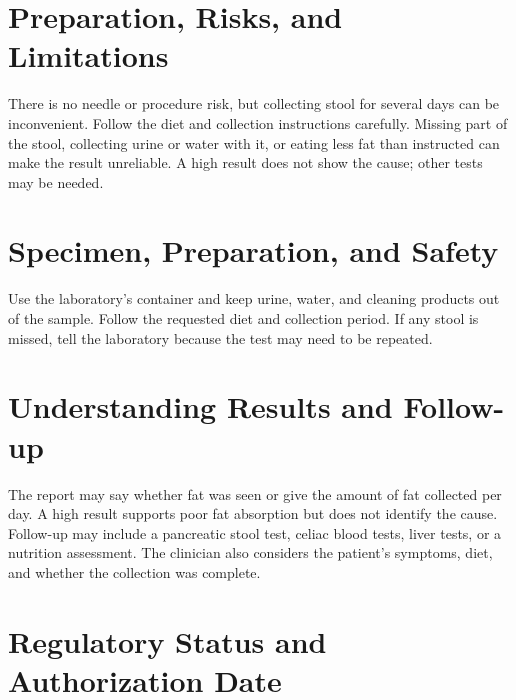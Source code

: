 \section*{Preparation, Risks, and Limitations}
There is no needle or procedure risk, but collecting stool for several days can be inconvenient. Follow the diet and collection instructions carefully. Missing part of the stool, collecting urine or water with it, or eating less fat than instructed can make the result unreliable. A high result does not show the cause; other tests may be needed.
\section*{Specimen, Preparation, and Safety}
Use the laboratory's container and keep urine, water, and cleaning products out of the sample. Follow the requested diet and collection period. If any stool is missed, tell the laboratory because the test may need to be repeated.

\section*{Understanding Results and Follow-up}
The report may say whether fat was seen or give the amount of fat collected per day. A high result supports poor fat absorption but does not identify the cause. Follow-up may include a pancreatic stool test, celiac blood tests, liver tests, or a nutrition assessment. The clinician also considers the patient's symptoms, diet, and whether the collection was complete.

\section*{Regulatory Status and Authorization Date}

\clearpage
